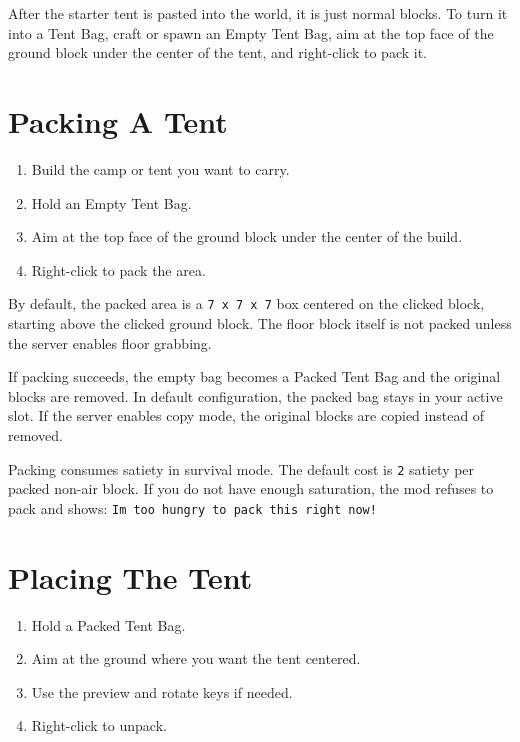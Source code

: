 \documentclass[
  11pt,
  letterpaper,
  titlepage]{article}
\providecommand{\tightlist}{%
  \setlength{\itemsep}{0pt}\setlength{\parskip}{0pt}}
\begin{document}
After the starter tent is pasted into the world, it is just normal
blocks. To turn it into a Tent Bag, craft or spawn an Empty Tent Bag,
aim at the top face of the ground block under the center of the tent,
and right-click to pack it.

\section{Packing A Tent}\label{packing-a-tent}

\begin{enumerate}
\def\labelenumi{\arabic{enumi}.}
\tightlist
\item
  Build the camp or tent you want to carry.
\item
  Hold an Empty Tent Bag.
\item
  Aim at the top face of the ground block under the center of the build.
\item
  Right-click to pack the area.
\end{enumerate}

By default, the packed area is a \texttt{7\ x\ 7\ x\ 7} box centered on
the clicked block, starting above the clicked ground block. The floor
block itself is not packed unless the server enables floor grabbing.

If packing succeeds, the empty bag becomes a Packed Tent Bag and the
original blocks are removed. In default configuration, the packed bag
stays in your active slot. If the server enables copy mode, the original
blocks are copied instead of removed.

Packing consumes satiety in survival mode. The default cost is
\texttt{2} satiety per packed non-air block. If you do not have enough
saturation, the mod refuses to pack and shows:
\texttt{I\textquotesingle{}m\ too\ hungry\ to\ pack\ this\ right\ now!}

\section{Placing The Tent}\label{placing-the-tent}

\begin{enumerate}
\def\labelenumi{\arabic{enumi}.}
\tightlist
\item
  Hold a Packed Tent Bag.
\item
  Aim at the ground where you want the tent centered.
\item
  Use the preview and rotate keys if needed.
\item
  Right-click to unpack.
\end{enumerate}
\end{document}
